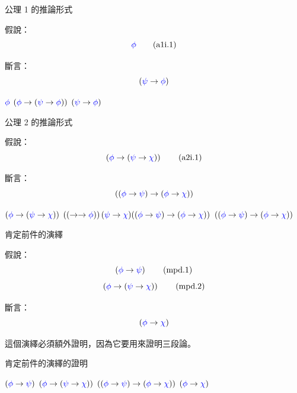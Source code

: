 \documentclass{Slideshow}
\begin{document}
\begin{frame}{公理 1 的推論形式}
    \begin{theorem}[\mmurl{a1i}]
        假說：
        \[ \wph \tag{a1i.1} \]

        斷言：
        \[ \wi\wps\wph \]

        \begin{mmproof}{2em}{3em}
                $\wph$
                \label{a1i:1}
                $\axI\wph\wps$
                \label{a1i:2}
                $\wi\wps\wph$
        \end{mmproof}
    \end{theorem}
\end{frame}

\begin{frame}{公理 2 的推論形式}
    \begin{theorem}[\mmurl{a2i}]
        \newcommand{\hyp}{\wi\wph{\wi\wps\wch}}

        假說：
        \[ \hyp \tag{a2i.1} \]

        斷言：
        \[ \aIIi\wph\wps\wch \]

        \begin{mmproof}{2em}{3em}
                $\hyp$
                \label{a2i:1}
                $\wi\hyp{\aIIi\wph\wps\wch}$
                \label{a2i:2}
                $\aIIi\wph\wps\wch$
        \end{mmproof}
    \end{theorem}
\end{frame}

\begin{frame}{肯定前件的演繹}
    \begin{theorem}
        假說：
        \[ \wi\wph\wps          \tag{mpd.1} \]
        \[ \wi\wph{\wi\wps\wch} \tag{mpd.2} \]

        斷言：
        \[ \wi\wph\wch \]
    \end{theorem}

    這個演繹必須額外證明，因為它要用來證明三段論。
\end{frame}

\begin{frame}{肯定前件的演繹的證明}
    \begin{mmproof}{2em}{3em}
            $\wi\wph\wps$
            \label{mpd:1}
            $\wi\wph{\wi\wps\wch}$
            \label{mpd:2}
            $\aIIi\wph\wps\wch$
            \label{mpd:3}
            $\wi\wph\wch$
    \end{mmproof}
\end{frame}
\end{document}
